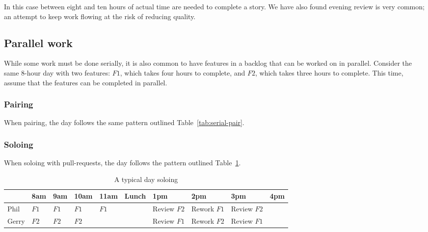 \documentclass[letterpaper]{article}
\theoremstyle{definition}
\begin{document}
    In this case between eight and ten hours of actual time are needed to complete a story.
    We have also found evening review is very common;
    an attempt to keep work flowing at the risk of reducing quality.

    \subsection{Parallel work}\label{subsec:parallel-work}

    While some work must be done serially, it is also common to have features in a backlog that can be worked on in
    parallel.
    Consider the same 8-hour day with two features: $F1$, which takes four hours to complete, and
    $F2$, which takes three hours to complete.
    This time, assume that the features can be completed in parallel.

    \subsubsection{Pairing}\label{subsubsec:parallel-pairing}

    When pairing, the day follows the same pattern outlined Table~\ref{tab:serial-pair}.

    \subsubsection{Soloing}\label{subsubsec:parallel-soloing}

    When soloing with pull-requests, the day follows the pattern outlined Table~\ref{tab:parallel-solo}.

    \begin{table}[h]
        \centering
        \tiny
        \begin{tabular}{ |l|l|l|l|l|l|l|l|l|l| }
            \hline
            & 8am                     & 9am                     & 10am                    & 11am                    & Lunch & 1pm                            & 2pm                            & 3pm                            & 4pm \\
            \hline
            Phil  & \cellcolor{blue!10}$F1$ & \cellcolor{blue!10}$F1$ & \cellcolor{blue!10}$F1$ & \cellcolor{blue!10}$F1$ &       & \cellcolor{red!10}Review $F2$ & \cellcolor{blue!10}Rework $F1$ & \cellcolor{red!10}Review $F2$ &     \\
            \hline
            Gerry & \cellcolor{red!10}$F2$  & \cellcolor{red!10}$F2$  & \cellcolor{red!10}$F2$  & &       & \cellcolor{blue!10}Review $F1$ & \cellcolor{red!10}Rework $F2$ & \cellcolor{blue!10}Review $F1$ &     \\
            \hline
        \end{tabular}
        \caption{A typical day soloing}
        \label{tab:parallel-solo}
    \end{table}
\end{document}
